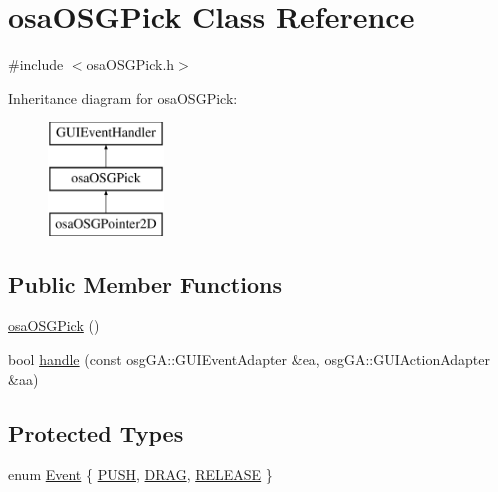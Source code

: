 \hypertarget{classosa_o_s_g_pick}{\section{osa\-O\-S\-G\-Pick Class Reference}
\label{classosa_o_s_g_pick}
}


{\ttfamily \#include $<$osa\-O\-S\-G\-Pick.\-h$>$}

Inheritance diagram for osa\-O\-S\-G\-Pick\-:\begin{figure}[H]
\begin{center}
\leavevmode
\includegraphics[height=3.000000cm]{d4/da0/classosa_o_s_g_pick}
\end{center}
\end{figure}
\subsection*{Public Member Functions}
\begin{DoxyCompactItemize}
\item 
\hyperlink{classosa_o_s_g_pick_a16d9b31f163a44fea8d098398da6a797}{osa\-O\-S\-G\-Pick} ()
\item 
bool \hyperlink{classosa_o_s_g_pick_a35a6dbbce50857efc81da9a8e0ff8340}{handle} (const osg\-G\-A\-::\-G\-U\-I\-Event\-Adapter \&ea, osg\-G\-A\-::\-G\-U\-I\-Action\-Adapter \&aa)
\end{DoxyCompactItemize}
\subsection*{Protected Types}
\begin{DoxyCompactItemize}
\item 
enum \hyperlink{classosa_o_s_g_pick_af50ae1a966b6f3282b707d73f87081d8}{Event} \{ \hyperlink{classosa_o_s_g_pick_af50ae1a966b6f3282b707d73f87081d8a79bd268c21a59826c7f515485984076a}{P\-U\-S\-H}, 
\hyperlink{classosa_o_s_g_pick_af50ae1a966b6f3282b707d73f87081d8a8f7bf352f87b9fd779b883e8b0457ad4}{D\-R\-A\-G}, 
\hyperlink{classosa_o_s_g_pick_af50ae1a966b6f3282b707d73f87081d8a209c4a4545061ed9e9ec0fbe2d86953d}{R\-E\-L\-E\-A\-S\-E}
 \}
\end{DoxyCompactItemize}
